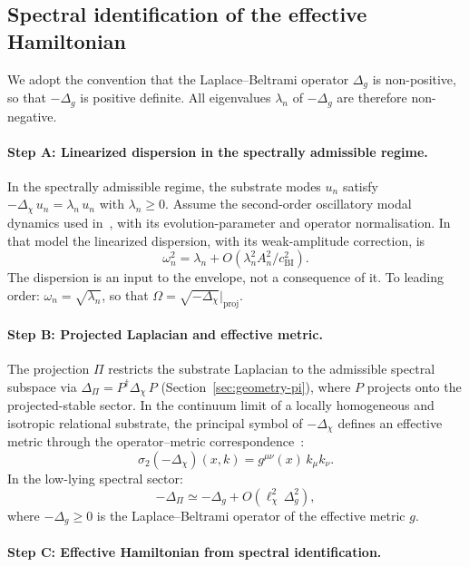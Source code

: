 \subsection{Spectral identification of the effective Hamiltonian}
  \label{app:schrodinger-hamiltonian}

  We adopt the convention that the Laplace--Beltrami operator $\Delta_g$ is non-positive,
  so that $-\Delta_g$ is positive definite.
  All eigenvalues $\lambda_n$ of $-\Delta_g$ are therefore non-negative.

  \paragraph{Step A: Linearized dispersion in the spectrally admissible regime.}

    In the spectrally admissible regime, the substrate modes $u_n$ satisfy
    $-\Delta_\chi\,u_n = \lambda_n\,u_n$ with $\lambda_n \geq 0$.
    Assume the second-order oscillatory modal dynamics used in~\cite{Beau2026a1}, with its
    evolution-parameter and operator normalisation.
    In that model the linearized dispersion, with its weak-amplitude correction, is
    \[
      \omega_n^2 = \lambda_n + O\!\left(\lambda_n^2 A_n^2 / c_{\mathrm{BI}}^2\right).
    \]
    The dispersion is an input to the envelope, not a consequence of it.
    To leading order: $\omega_n = \sqrt{\lambda_n}$, so that
    $\Omega = \sqrt{-\Delta_\chi}|_{\mathrm{proj}}$.

  \paragraph{Step B: Projected Laplacian and effective metric.}

    The projection $\Pi$ restricts the substrate Laplacian to the admissible spectral
    subspace via $\Delta_\Pi = P^\dagger \Delta_\chi\, P$ (Section~\ref{sec:geometry-pi}),
    where $P$ projects onto the projected-stable sector.
    In the continuum limit of a locally homogeneous and isotropic relational substrate,
    the principal symbol of $-\Delta_\chi$ defines an effective metric through the
    operator--metric correspondence~\cite{Beau2026c}:
    \[
      \sigma_2(-\Delta_\chi)(x,k) = g^{\mu\nu}(x)\,k_\mu k_\nu.
    \]
    In the low-lying spectral sector:
    \[
      -\Delta_\Pi \simeq -\Delta_g + O(\ell_\chi^2\,\Delta_g^2),
    \]
    where $-\Delta_g \geq 0$ is the Laplace--Beltrami operator of the effective metric $g$.

  \paragraph{Step C: Effective Hamiltonian from spectral identification.}

